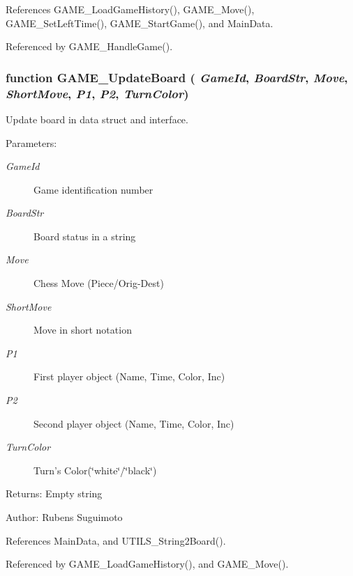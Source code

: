 References GAME\_\-LoadGameHistory(), GAME\_\-Move(), GAME\_\-SetLeftTime(), GAME\_\-StartGame(), and MainData.

Referenced by GAME\_\-HandleGame().
\subsubsection[GAME\_\-UpdateBoard]{\setlength{\rightskip}{0pt plus 5cm}function GAME\_\-UpdateBoard ( {\em GameId}, \/   {\em BoardStr}, \/   {\em Move}, \/   {\em ShortMove}, \/   {\em P1}, \/   {\em P2}, \/   {\em TurnColor})}\label{game_2game_8js_551d1cb08ed611a572fb141a3bdfb9ef}


Update board in data struct and interface. 

\begin{Desc}
\item[Parameters:]
\begin{description}
\item[{\em GameId}]Game identification number \item[{\em BoardStr}]Board status in a string \item[{\em Move}]Chess Move (Piece/Orig-Dest) \item[{\em ShortMove}]Move in short notation \item[{\em P1}]First player object (Name, Time, Color, Inc) \item[{\em P2}]Second player object (Name, Time, Color, Inc) \item[{\em TurnColor}]Turn's Color(\char`\"{}white\char`\"{}/\char`\"{}black\char`\"{}) \end{description}
\end{Desc}
\begin{Desc}
\item[Returns:]Empty string \end{Desc}
\begin{Desc}
\item[Author:]Rubens Suguimoto \end{Desc}


References MainData, and UTILS\_\-String2Board().

Referenced by GAME\_\-LoadGameHistory(), and GAME\_\-Move().
